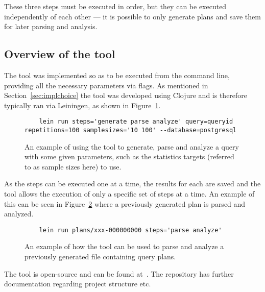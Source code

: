 These three steps must be executed in order, but they can be executed
independently of each other --- it is possible to only generate plans and save
them for later parsing and analysis.

\subsection{Overview of the tool}
The tool was implemented so as to be executed from the command line, providing
all the necessary parameters via flags. As mentioned in
Section~\ref{sec:implchoice} the tool was developed using Clojure and is
therefore typically ran via Leiningen, as shown in
Figure~\ref{fig:cmd:runtool1}.

\begin{figure}[ht]
  \begin{verbatim}
    lein run steps='generate parse analyze' query=queryid repetitions=100 samplesizes='10 100' --database=postgresql
  \end{verbatim}
  \caption[Using the tool to generate, parse and analyze a query]{An example of
    using the tool to generate, parse and analyze a query with some given
    parameters, such as the statistics targets (referred to as sample sizes here)
    to use.}\label{fig:cmd:runtool1}
\end{figure}

As the steps can be executed one at a time, the results for each are saved and
the tool allows the execution of only a specific set of steps at a time. An
example of this can be seen in Figure~\ref{fig:cmd:runtool2} where a previously
generated plan is parsed and analyzed.

\begin{figure}[ht]
  \begin{verbatim}
    lein run plans/xxx-000000000 steps='parse analyze'
  \end{verbatim}
  \caption[Using the tool to parse and analyze a previously generated plan]{An
    example of how the tool can be used to parse and analyze a previously
    generated file containing query plans.}\label{fig:cmd:runtool2}
\end{figure}

The tool is open-source and can be found at~\cite{barksten_mbark_m}. The
repository has further documentation regarding project structure etc.

